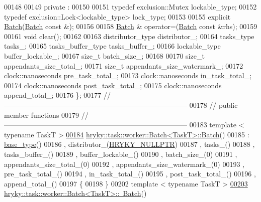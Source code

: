 \begin{DoxyCode}
00148 
00149 \textcolor{keyword}{private} :
00150 
00151     \textcolor{keyword}{typedef} exclusion::Mutex                lockable\_type;
00152     \textcolor{keyword}{typedef} exclusion::Lock<lockable\_type>  lock\_type;
00153 
00155     \textcolor{keyword}{explicit} \hyperlink{group__task_ga1e0c51798108868eef5a4f126640b4d7}{Batch}(\hyperlink{group__task_ga1e0c51798108868eef5a4f126640b4d7}{Batch} \textcolor{keyword}{const} &);
00156 
00158     \hyperlink{group__task_ga1e0c51798108868eef5a4f126640b4d7}{Batch} & operator=(\hyperlink{group__task_ga1e0c51798108868eef5a4f126640b4d7}{Batch} \textcolor{keyword}{const} &rhs);
00159 
00161     \textcolor{keywordtype}{void} clear();
00162 
00163     distributor\_type        distributor\_;
00164     tasks\_type              tasks\_;
00165     tasks\_buffer\_type       tasks\_buffer\_;
00166     lockable\_type           buffer\_lockable\_;
00167     \textcolor{keywordtype}{size\_t}                  batch\_size\_;
00168 
00170     \textcolor{keywordtype}{size\_t}                  appendants\_size\_total\_;
00171     \textcolor{keywordtype}{size\_t}                  appendants\_size\_watermark\_;
00172     clock::nanoseconds      pre\_task\_total\_;
00173     clock::nanoseconds      in\_task\_total\_;
00174     clock::nanoseconds      post\_task\_total\_;
00175     clock::nanoseconds      append\_total\_;
00176 \};
00177 \textcolor{comment}{//
      ------------------------------------------------------------------------------}
00178 \textcolor{comment}{// public member functions}
00179 \textcolor{comment}{//
      ------------------------------------------------------------------------------}
00183 \textcolor{comment}{}\textcolor{keyword}{template} < \textcolor{keyword}{typename} TaskT >
\hypertarget{task__worker__batch_8h_source_l00184}{}\hyperlink{group__task_ga1e0c51798108868eef5a4f126640b4d7}{00184} \hyperlink{group__task_ga1e0c51798108868eef5a4f126640b4d7}{hryky::task::worker::Batch<TaskT>::Batch}()
00185     : \hyperlink{classhryky_1_1task_1_1worker_1_1_base}{base_type}()
00186       , distributor\_(\hyperlink{common_8h_a4cd4ac09cfcdbd6b30ee69afc156e210}{HRYKY_NULLPTR})
00187       , tasks\_()
00188       , tasks\_buffer\_()
00189       , buffer\_lockable\_()
00190       , batch\_size\_(0)
00191       , appendants\_size\_total\_(0)
00192       , appendants\_size\_watermark\_(0)
00193       , pre\_task\_total\_()
00194       , in\_task\_total\_()
00195       , post\_task\_total\_()
00196       , append\_total\_()
00197 \{
00198 \}
00202 \textcolor{keyword}{template} < \textcolor{keyword}{typename} TaskT >
\hypertarget{task__worker__batch_8h_source_l00203}{}\hyperlink{group__task_ga11956032bccdfa3a83ec3615f9c03d0f}{00203} \hyperlink{classhryky_1_1task_1_1worker_1_1_batch}{hryky::task::worker::Batch<TaskT>::~Batch}()

\end{DoxyCode}
